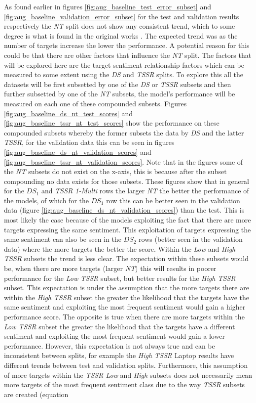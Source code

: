 As found earlier in figures \ref{fig:aug_baseline_test_error_subset} and \ref{fig:aug_baseline_validation_error_subset} for the test and validation results respectively the \textit{NT} split does not show any consistent trend, which to some degree is what is found in the original works \citep{he-etal-2018-effective,zhang-etal-2019-aspect}. The expected trend was as the number of targets increase the lower the performance. A potential reason for this could be that there are other factors that influence the \textit{NT} split. The factors that will be explored here are the target sentiment relationship factors which can be measured to some extent using the \textit{DS} and \textit{TSSR} splits. To explore this all the datasets will be first subsetted by one of the \textit{DS} or \textit{TSSR} subsets and then further subsetted by one of the \textit{NT} subsets, the model's performance will be measured on each one of these compounded subsets. Figures \ref{fig:aug_baseline_ds_nt_test_scores} and \ref{fig:aug_baseline_tssr_nt_test_scores} show the performance on these compounded subsets whereby the former subsets the data by \textit{DS} and the latter \textit{TSSR}, for the validation data this can be seen in figures \ref{fig:aug_baseline_ds_nt_validation_scores} and \ref{fig:aug_baseline_tssr_nt_validation_scores}. Note that in the figures some of the \textit{NT} subsets do not exist on the x-axis, this is because after the subset compounding no data exists for those subsets. These figures show that in general for the $DS_1$ and \textit{TSSR 1-Multi} rows the larger \textit{NT} the better the performance of the models, of which for the $DS_1$ row this can be better seen in the validation data (figure \ref{fig:aug_baseline_ds_nt_validation_scores}) than the test. This is most likely the case because of the models exploiting the fact that there are more targets expressing the same sentiment. This exploitation of targets expressing the same sentiment can also be seen in the $DS_2$ rows (better seen in the validation data) where the more targets the better the score. Within the \textit{Low} and \textit{High TSSR} subsets the trend is less clear. The expectation within these subsets would be, when there are more targets (larger \textit{NT}) this will results in poorer performance for the \textit{Low TSSR} subset, but better results for the \textit{High TSSR} subset. This expectation is under the assumption that the more targets there are within the \textit{High TSSR} subset the greater the likelihood that the targets have the same sentiment and exploiting the most frequent sentiment would gain a higher performance score. The opposite is true when there are more targets within the \textit{Low TSSR} subset the greater the likelihood that the targets have a different sentiment and exploiting the most frequent sentiment would gain a lower performance. However, this expectation is not always true and can be inconsistent between splits, for example the \textit{High TSSR} Laptop results have different trends between test and validation splits. Furthermore, this assumption of more targets within the \textit{TSSR Low} and \textit{High} subsets does not necessarily mean more targets of the most frequent sentiment class due to the way \textit{TSSR} subsets are created (equation 